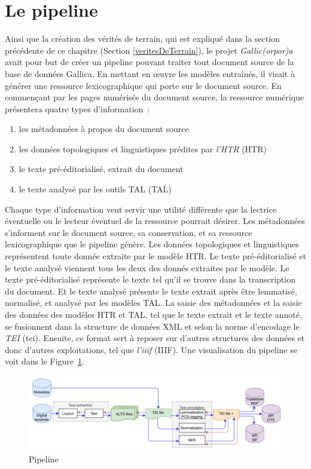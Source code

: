 \documentclass[class=article, crop=false]{standalone}
\begin{document}
\section{Le pipeline}
Ainsi que la création des vérités de terrain, qui est expliqué dans la section précédente de ce chapitre (Section \ref{veritesDeTerrain}), le projet \textit{Gallic(orpor)a} avait pour but de créer un pipeline pouvant traiter tout document source de la base de données Gallica. En mettant en œuvre les modèles entraînés, il visait à générer une ressource lexicographique qui porte sur le document source. En commençant par les pages numérisés du document source, la ressource numérique présentera quatre types d'information~:
\begin{enumerate}
\item les métadonnées à propos du document source
\item les données topologiques et linguistiques prédites par \textit{l'\acrlong{HTR}} (\acrshort{HTR})
\item le texte pré-éditorialisé, extrait du document
\item le texte analysé par les outils \acrlong{TAL} (\acrshort{TAL})
\end{enumerate}
Chaque type d'information veut servir une utilité différente que la lectrice éventuelle ou le lecteur éventuel de la ressource pourrait désirer. Les métadonnées s'informent sur le document source, sa conservation, et sa ressource lexicographique que le pipeline génère. Les données topologiques et linguistiques représentent toute donnée extraite par le modèle \acrshort{HTR}. Le texte pré-éditorialisé et le texte analysé viennent tous les deux des donnés extraites par le modèle. Le texte pré-éditorialisé représente le texte tel qu'il se trouve dans la transcription du document. Et le texte analysé présente le texte extrait après être lemmatisé, normalisé, et analysé par les modèles \acrshort{TAL}.
La saisie des métadonnées et la saisie des données des modèles \acrshort{HTR} et \acrshort{TAL}, tel que le texte extrait et le texte annoté, se fusionnent dans la structure de données XML et selon la norme d'encodage le \textit{\Gls{TEI}} (\acrshort{tei}). Ensuite, ce format sert à reposer sur d'autres structures des données et donc d'autres exploitations, tel que \textit{l'\Gls{iiif}} (\acrshort{IIIF}). Une visualisation du pipeline se voit dans le Figure~\ref{fig:pipeline}.

\begin{figure}[hbt!]
\includegraphics[width=\textwidth]{../../../images/pipeline.png}
\caption{Pipeline}
\label{fig:pipeline}
\end{figure}
\end{document}
